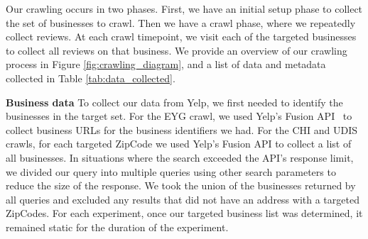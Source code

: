 \begin{table}[t]
    \centering
    \caption{Data and metadata collected.}
    \label{tab:data_collected}
\end{table}

Our crawling occurs in two phases.
First, we have an initial setup phase to collect the set of businesses to crawl. Then we have a crawl phase, where we repeatedly collect reviews. At each crawl timepoint, we visit each of the targeted businesses to collect all reviews on that business. We provide an overview of our crawling process in Figure \ref{fig:crawling_diagram}, and a list of data and metadata collected in Table \ref{tab:data_collected}. 

\textbf{Business data}
To collect our data from Yelp, we first needed to identify the businesses in the target set. For the EYG crawl, we used Yelp's Fusion API~\cite{yelpfusion} to collect business URLs for the business identifiers we had. For the CHI and UDIS crawls, for each targeted ZipCode we used Yelp's Fusion API to collect a list of all businesses. In situations where the search exceeded the API's response limit, we divided our query into multiple queries using other search parameters to reduce the size of the response. We took the union of the businesses returned by all queries and excluded any results that did not have an address with a targeted ZipCodes. For each experiment, once our targeted business list was determined, it remained static for the duration of the experiment.

